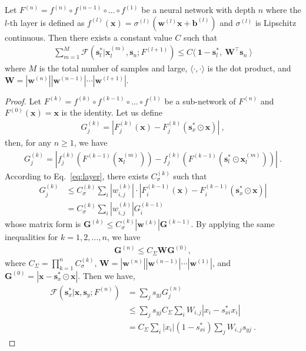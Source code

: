 \documentclass[10pt,twocolumn,letterpaper]{article}
\def\mb{\mathbf}
\begin{document}
Let $F^{(n)}=f^{(n)}\circ f^{(n-1)}\circ\dots\circ f^{(1)}$ be a neural network with depth $n$ where the $l$-th layer is defined as $f^{(l)}(\mb x)=\sigma^{(l)}(\mb w^{(l)}\mb x+\mb b^{(l)})$ and $\sigma^{(l)}$ is Lipschitz continuous. Then there exists a constant value $C$ such that
\begin{align}\label{eq:layer}
    \sum_{m=1}^M\mathcal{F}(\mb s^*_l|\mb x^{(m)}_l, \mb s_n; F^{(l+1)})\le C\langle\ \mb 1-\mb s^*_l,\ \mb W^\intercal\mb s_n\ \rangle
\end{align}
where $M$ is the total number of samples and large, $\langle\cdot,\cdot\rangle$ is the dot product, and $\mb W=|\mb w^{(n)}||\mb w^{(n-1)}|\cdots|\mb w^{(l+1)}|$.
\begin{proof}Let $F^{(k)}=f^{(k)}\circ f^{(k-1)}\circ\dots\circ f^{(1)}$ be a sub-network of $F^{(n)}$ and $F^{(0)}(\mb x)=\mb x$ is the identity. Let us define
\begin{align}
G^{(k)}_j=|F_{j}^{(k)}(\mb x)-F_{j}^{(k)}(\mb s^*_x\odot\mb x)|~,\nonumber
\end{align}
then, for any $n\ge 1$, we have
\begin{align}
    G^{(k)}_j=|f^{(k)}_j(F^{(k-1)}(\mb x^{(m)}_l))-f^{(k)}_j(F^{(k-1)}(\mb s^*_l\odot\mb x^{(m)}_l))|\nonumber~.
    \end{align}
    According to Eq.~\ref{eq:layer}, there exists $C_\sigma^{(k)}$ such that
    \begin{align}
    G^{(k)}_j
    &\le C_\sigma^{(k)}\sum_{i}|w_{i,j}^{(k)}|\cdot|F^{(k-1)}_{i}(\mb x)-F_{i}^{(k-1)}(\mb s^*_x\odot\mb x)|\nonumber\\
    &= C_\sigma^{(k)}\sum_{i}|w_{i,j}^{(k)}|G^{(k-1)}_i\nonumber
\end{align}
whose matrix form is
$\mb G^{(k)}\le C_\sigma^{(k)}|\mb w^{(k)}|\mb G^{(k-1)}$.
By applying the same inequalities for $k=1,2,\ldots,n$, we have
\begin{align}
\mb G^{(n)}\le C_\Sigma\mb W\mb G^{(0)},\nonumber
\end{align}
where $C_\Sigma=\prod_{k=1}^n C_\sigma^{(k)}$, $\mb W=|\mb w^{(n)}||\mb w^{(n-1)}|\cdots|\mb w^{(1)}|$, and $\mb G^{(0)}=|\mb x - \mb s^*_x\odot\mb x|$. Then we have,
\begin{align}
\mathcal{F}(\mb s^*_x|\mb x, \mb s_y; F^{(n)})&=\sum_j s_{yj}G_j^{(n)}\nonumber\\
&\le \sum_j s_{yj}C_\Sigma\sum_iW_{i,j}|x_i - s^*_{xi}x_i|\nonumber\\
&= C_\Sigma\sum_i |x_i|(1-s^*_{xi})\sum_j W_{i,j}s_{yj}\nonumber~.
\end{align}

\end{proof}
\end{document}
